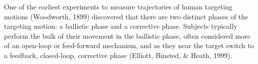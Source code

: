 %
%
%
One of the earliest experiments to measure trajectories of human targeting motions (Woodworth, 1899) discovered that there are two distinct phases of the targeting motion: a ballistic phase and a corrective phase.
Subjects typically perform the bulk of their movement in the ballistic phase, often considered more of an open-loop or feed-forward mechanism, and as they near the target switch to a feedback, closed-loop, corrective phase (Elliott, Binsted, \& Heath, 1999).


